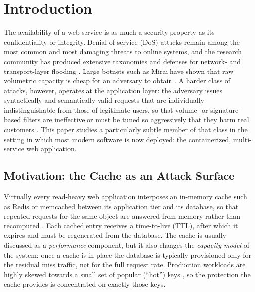\documentclass[preprint,12pt]{elsarticle}
\begin{document}
\clearpage
\tableofcontents
\clearpage

\section{Introduction}
\label{sec:intro}

The availability of a web service is as much a security property as its
confidentiality or integrity. Denial-of-service (DoS) attacks remain among the most
common and most damaging threats to online systems, and the research community has
produced extensive taxonomies and defenses for network- and transport-layer flooding
\cite{mirkovic2004,zargar2013}. Large botnets such as Mirai have shown that raw
volumetric capacity is cheap for an adversary to obtain \cite{antonakakis2017}. A
harder class of attacks, however, operates at the application layer: the adversary
issues syntactically and semantically valid requests that are individually
indistinguishable from those of legitimate users, so that volume- or signature-based
filters are ineffective or must be tuned so aggressively that they harm real customers
\cite{praseed2019,xie2009,ranjan2009}. This paper studies a particularly subtle member
of that class in the setting in which most modern software is now deployed: the
containerized, multi-service web application.

\subsection{Motivation: the Cache as an Attack Surface}
Virtually every read-heavy web application interposes an in-memory cache such as
Redis or memcached between its application tier and its database, so that repeated
requests for the same object are answered from memory rather than recomputed
\cite{fitzpatrick2004,nishtala2013}. Each cached entry receives a time-to-live (TTL),
after which it expires and must be regenerated from the database. The cache is usually
discussed as a \emph{performance} component, but it also changes the \emph{capacity
model} of the system: once a cache is in place the database is typically provisioned
only for the residual miss traffic, not for the full request rate. Production
workloads are highly skewed towards a small set of popular (``hot'') keys
\cite{breslau1999,atikoglu2012}, so the protection the cache provides is concentrated
on exactly those keys.
\end{document}
